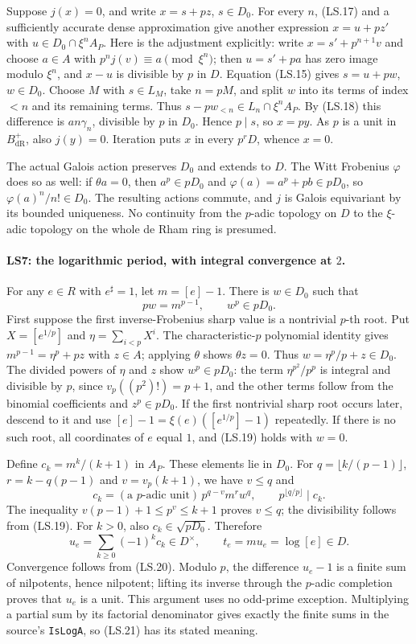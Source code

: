Suppose $j(x)=0$, and write $x=s+pz$, $s\in D_0$.
For every $n$, (LS.17) and a sufficiently accurate dense approximation
give another expression $x=u+pz'$ with
$u\in D_0\cap\xi^nA_P$. Here is the adjustment explicitly:
write $x=s'+p^{n+1}v$ and choose $a\in A$ with
$p^n j(v)\equiv a\pmod{\xi^n}$; then $u=s'+pa$ has zero image
modulo $\xi^n$, and $x-u$ is divisible by $p$ in $D$.
Equation (LS.15) gives $s=u+pw$, $w\in D_0$.
Choose $M$ with $s\in L_M$, take $n=pM$, and split $w$ into
its terms of index $<n$ and its remaining terms. Thus
$s-pw_{<n}\in L_n\cap\xi^nA_P$. By (LS.18) this difference
is $a n\gamma_n$, divisible by $p$ in $D_0$. Hence $p\mid s$,
so $x=py$. As $p$ is a unit in $B_{\mathrm{dR}}^+$, also
$j(y)=0$. Iteration puts $x$ in every $p^rD$, whence $x=0$.

The actual Galois action preserves $D_0$ and extends to $D$.
The Witt Frobenius $\varphi$ does so as well: if
$\theta a=0$, then $a^p\in pD_0$ and
$\varphi(a)=a^p+pb\in pD_0$, so
$\varphi(a)^n/n!\in D_0$. The resulting actions commute, and
$j$ is Galois equivariant by its bounded uniqueness. No continuity
from the $p$-adic topology on $D$ to the $\xi$-adic topology on the
whole de Rham ring is presumed.

\paragraph{LS7: the logarithmic period, with integral convergence at $2$.}
For any $e\in R$ with $e^\sharp=1$, let $m=[e]-1$.
There is $w\in D_0$ such that
\[
                    pw=m^{p-1},\qquad w^p\in pD_0. \tag{LS.19}
\]
First suppose the first inverse-Frobenius sharp value is a nontrivial
$p$-th root. Put $X=[e^{1/p}]$ and $\eta=\sum_{i<p}X^i$.
The characteristic-$p$ polynomial identity gives
$m^{p-1}=\eta^p+pz$ with $z\in A$; applying $\theta$ shows
$\theta z=0$. Thus $w=\eta^p/p+z\in D_0$.
The divided powers of $\eta$ and $z$ show $w^p\in pD_0$:
the term $\eta^{p^2}/p^p$ is integral and divisible by $p$, since
$v_p((p^2)!)=p+1$, and the other terms follow from the binomial
coefficients and $z^p\in pD_0$. If the first nontrivial sharp root
occurs later, descend to it and use
$[e]-1=\xi(e)([e^{1/p}]-1)$ repeatedly. If there is no such root,
all coordinates of $e$ equal $1$, and (LS.19) holds with $w=0$.

Define $c_k=m^k/(k+1)$ in $A_P$. These elements lie in $D_0$.
For $q=\lfloor k/(p-1)\rfloor$, $r=k-q(p-1)$ and
$v=v_p(k+1)$, we have $v\le q$ and
\[
 c_k=(\text{a }p\text{-adic unit})\,p^{q-v}m^r w^q,
 \qquad p^{\lfloor q/p\rfloor}\mid c_k.            \tag{LS.20}
\]
The inequality $v(p-1)+1\le p^v\le k+1$ proves $v\le q$;
the divisibility follows from (LS.19). For $k>0$, also
$c_k\in\sqrt{pD_0}$. Therefore
\[
 u_e=\sum_{k\ge0}(-1)^k c_k\in D^\times,
 \qquad t_e=m u_e=\log[e]\in D.                   \tag{LS.21}
\]
Convergence follows from (LS.20). Modulo $p$, the difference
$u_e-1$ is a finite sum of nilpotents, hence nilpotent; lifting its
inverse through the $p$-adic completion proves that $u_e$ is a unit.
This argument uses no odd-prime exception. Multiplying a partial
sum by its factorial denominator gives exactly the finite sums in
the source's \texttt{IsLogA}, so (LS.21) has its stated meaning.

